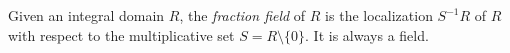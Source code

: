 \documentclass[12pt]{article}
\begin{document}
Given an integral domain $R$, the {\em fraction field} of $R$ is the localization $S^{-1} R$ of $R$ with respect to the multiplicative set $S = R \setminus \{0\}$. It is always a field.
\end{document}
